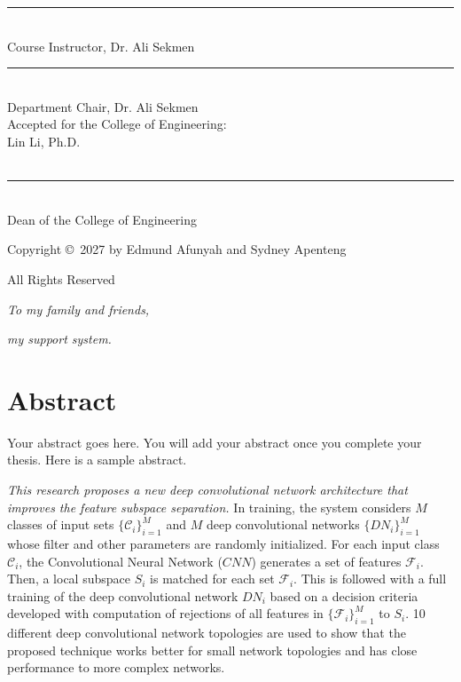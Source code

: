 \documentclass[12pt,letterpaper,oneside,reqno]{book}
\theoremstyle{plain}
\theoremstyle{definition}
\theoremstyle{plain}
\theoremstyle{remark}
\theoremstyle{plain}
\theoremstyle{definition}
\theoremstyle{plain}
\newcommand*{\threeemdash}{\rule[0.5ex]{17em}{1.5pt}}
\begin{document}
\hspace{8cm} \threeemdash \vspace{-0.4cm} \\
\indent \hspace{8cm} Course Instructor, Dr. Ali Sekmen\\
\vspace{0.3cm}

\hspace{8cm} \threeemdash \vspace{-0.4cm} \\
\indent \hspace{8cm} Department Chair, Dr. Ali Sekmen\\

\vspace{2cm}
Accepted for the College of Engineering:\\
\indent  Lin Li, Ph.D. \vspace{0.3cm}\\ \\
\indent \threeemdash \vspace{-0.4cm} \\
\indent Dean of the College of Engineering

\newpage
\singlespacing
\thispagestyle{empty}
\vspace*{4.5in}
\centerline{Copyright {\small\copyright}\ 2027 by Edmund Afunyah and Sydney Apenteng}
\centerline{All Rights Reserved}

\newpage
\setcounter{page}{2}

\vspace*{3in}
\centerline{\em To my family and friends,}
\vspace{18pt}
\centerline{\em my support system.}


\newpage
\doublespacing
\chapter{Abstract}
{\color{red}Your abstract goes here. You will add your abstract once you complete your thesis. Here is a sample abstract.}

\textit{This research proposes a new deep convolutional network architecture that improves the feature subspace separation.} In training, the system considers $M$ classes of input sets $\{\mathcal{C}_i\}_{i=1}^{M}$ and $M$ deep convolutional networks $\{DN_i\}_{i=1}^{M}$ whose filter and other parameters are randomly initialized. For each input class $\mathcal{C}_i$, the Convolutional Neural Network ($CNN$) generates a set of features $\mathcal{F}_i$. Then, a local subspace $S_i$ is matched for each set $\mathcal{F}_i$. This is followed with a full training of the deep convolutional network $DN_i$ based on a decision criteria developed with computation of rejections of all features in $\{\mathcal{F}_i\}_{i=1}^{M}$  to   $S_i$. 10 different deep convolutional network topologies are used to show that the proposed technique works better for small network topologies and has close performance to more complex networks.
\end{document}
